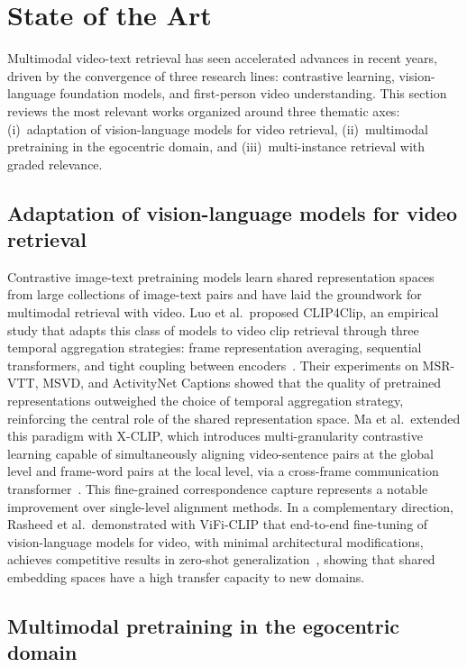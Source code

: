 \section{State of the Art}

Multimodal video-text retrieval has seen accelerated advances in recent years, driven by the convergence of three research lines: contrastive learning, vision-language foundation models, and first-person video understanding. This section reviews the most relevant works organized around three thematic axes: (i)~adaptation of vision-language models for video retrieval, (ii)~multimodal pretraining in the egocentric domain, and (iii)~multi-instance retrieval with graded relevance.

\subsection*{Adaptation of vision-language models for video retrieval}

Contrastive image-text pretraining models learn shared representation spaces from large collections of image-text pairs and have laid the groundwork for multimodal retrieval with video. Luo et al.~proposed CLIP4Clip, an empirical study that adapts this class of models to video clip retrieval through three temporal aggregation strategies: frame representation averaging, sequential transformers, and tight coupling between encoders~\cite{luo2022clip4clip}. Their experiments on MSR-VTT, MSVD, and ActivityNet Captions showed that the quality of pretrained representations outweighed the choice of temporal aggregation strategy, reinforcing the central role of the shared representation space. Ma et al.~extended this paradigm with X-CLIP, which introduces multi-granularity contrastive learning capable of simultaneously aligning video-sentence pairs at the global level and frame-word pairs at the local level, via a cross-frame communication transformer~\cite{ma2022xclip}. This fine-grained correspondence capture represents a notable improvement over single-level alignment methods. In a complementary direction, Rasheed et al.~demonstrated with ViFi-CLIP that end-to-end fine-tuning of vision-language models for video, with minimal architectural modifications, achieves competitive results in zero-shot generalization~\cite{rasheed2023vificlip}, showing that shared embedding spaces have a high transfer capacity to new domains.

\subsection*{Multimodal pretraining in the egocentric domain}

